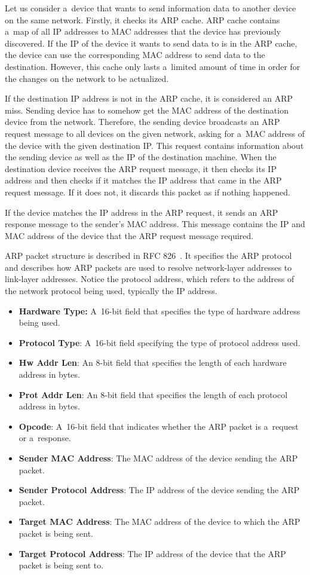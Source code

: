 \documentclass[
  printed,     %
  color,       %
  oneside,     %
  nosansbold,  %
  nocolorbold, %
  nolof,         %
  nolot,         %
]{fithesis4}
\begin{document}
Let us consider a~device that wants to send information data to another device on the same network. Firstly, it checks its ARP cache. ARP cache contains a~map of all IP addresses to MAC addresses that the device has previously discovered. If the IP of the device it wants to send data to is in the ARP cache, the device can use the corresponding MAC address to send data to the destination. However, this cache only lasts a~limited amount of time in order for the changes on the network to be actualized.

If the destination IP address is not in the ARP cache, it is considered an ARP miss. Sending device has to somehow get the MAC address of the destination device from the network. Therefore, the sending device broadcasts an ARP request message to all devices on the given network, asking for a~MAC address of the device with the given destination IP. This request contains information about the sending device as well as the IP of the destination machine. When the destination device receives the ARP request message, it then checks its IP address and then checks if it matches the IP address that came in the ARP request message. If it does not, it discards this packet as if nothing happened.

If the device matches the IP address in the ARP request, it sends an ARP response message to the sender's MAC address. This message contains the IP and MAC address of the device that the ARP request message required.

ARP packet structure is described in RFC 826~\cite{RFC0826}. It specifies the ARP protocol and describes how ARP packets are used to resolve network-layer addresses to link-layer addresses. Notice the protocol address, which refers to the address of the network protocol being used, typically the IP address.

\begin{itemize}[noitemsep,topsep=0pt]
    \item \textbf{Hardware Type:} A~16-bit field that specifies the type of hardware address being used.
    \item \textbf{Protocol Type}: A~16-bit field specifying the type of protocol address used.
    \item \textbf{Hw Addr Len}: An 8-bit field that specifies the length of each hardware address in bytes.
    \item \textbf{Prot Addr Len}: An 8-bit field that specifies the length of each protocol address in bytes.
    \item \textbf{Opcode}: A~16-bit field that indicates whether the ARP packet is a~request or a~response.
    \item \textbf{Sender MAC Address}: The MAC address of the device sending the ARP packet.
    \item \textbf{Sender Protocol Address}: The IP address of the device sending the ARP packet.
    \item \textbf{Target MAC Address}: The MAC address of the device to which the ARP packet is being sent.
    \item \textbf{Target Protocol Address}: The IP address of the device that the ARP packet is being sent to.
\end{itemize}
\end{document}
